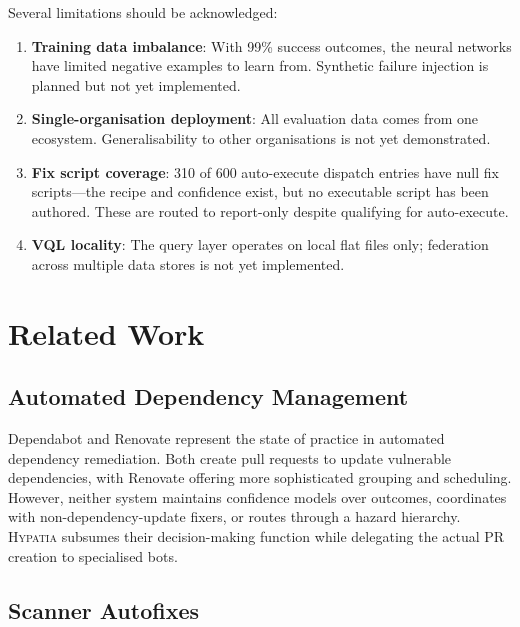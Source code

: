 \documentclass[11pt,a4paper]{article}
\begin{document}
Several limitations should be acknowledged:

\begin{enumerate}[nosep]
  \item \textbf{Training data imbalance}: With 99\% success outcomes, the neural networks have limited negative examples to learn from. Synthetic failure injection is planned but not yet implemented.
  \item \textbf{Single-organisation deployment}: All evaluation data comes from one ecosystem. Generalisability to other organisations is not yet demonstrated.
  \item \textbf{Fix script coverage}: 310 of 600 auto-execute dispatch entries have null fix scripts---the recipe and confidence exist, but no executable script has been authored. These are routed to report-only despite qualifying for auto-execute.
  \item \textbf{VQL locality}: The query layer operates on local flat files only; federation across multiple data stores is not yet implemented.
\end{enumerate}


\section{Related Work}
\label{sec:related}

\subsection{Automated Dependency Management}

Dependabot \citep{dependabot2017} and Renovate \citep{renovate2017} represent the state of practice in automated dependency remediation. Both create pull requests to update vulnerable dependencies, with Renovate offering more sophisticated grouping and scheduling. However, neither system maintains confidence models over outcomes, coordinates with non-dependency-update fixers, or routes through a hazard hierarchy. \textsc{Hypatia} subsumes their decision-making function while delegating the actual PR creation to specialised bots.

\subsection{Scanner Autofixes}
\end{document}

